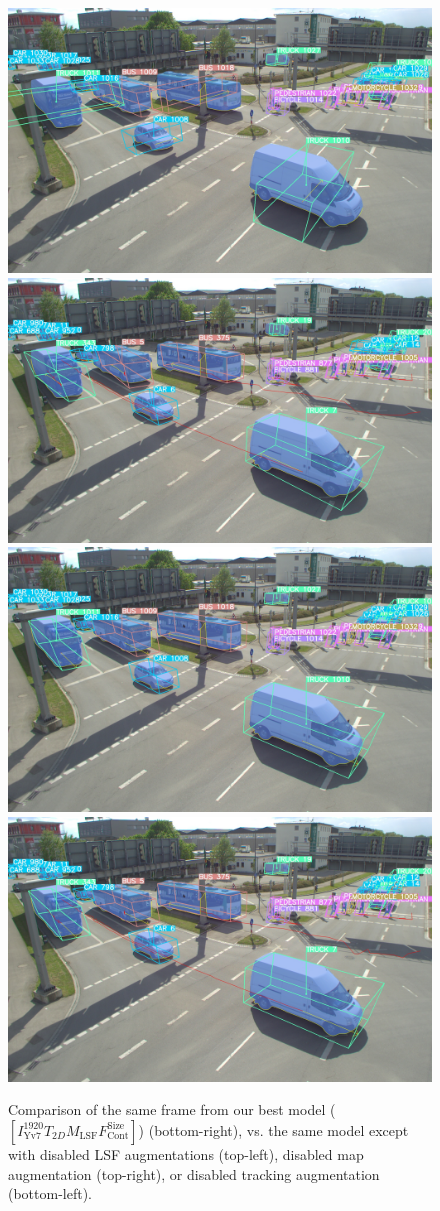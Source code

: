 \begin{figure}[h!]
    \centering
    \includegraphics[width=0.45\linewidth]{
        figures/selection/1651673054-274505919-s110-camera-basler-south2-8mm-nomaptrack}
    \includegraphics[width=0.45\linewidth]{
        figures/selection/1651673054-274505919-s110-camera-basler-south2-8mm-nomap} \\
    \includegraphics[width=0.45\linewidth]{
        figures/selection/1651673054-274505919-s110-camera-basler-south2-8mm-notrack}
    \includegraphics[width=0.45\linewidth]{
        figures/selection/1651673054-274505919-s110-camera-basler-south2-8mm}
    \caption{Comparison of the same frame from our best model ($\left[I^{1920}_\text{Yv7}T_{2D}M_\text{LSF}F_\text{Cont}^\text{Size}\right]$) (bottom-right), vs. the same model except with disabled LSF augmentations (top-left), disabled map augmentation (top-right), or disabled tracking augmentation (bottom-left).}
    \label{fig:qualitative-results-lsf-augments}
\end{figure}


